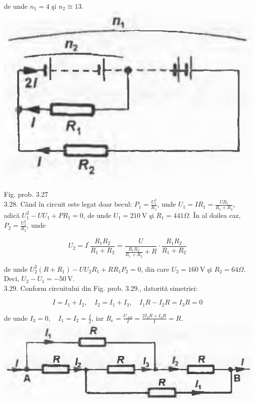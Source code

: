 \documentclass[10pt]{article}
\begin{document}
de unde $n_{1}=4$ şi $n_{2} \cong 13$.\\
\includegraphics[max width=\textwidth, center]{2025_07_01_5b3ff9fa0d508c8e9f17g-346}

Fig. prob. 3.27\\
3.28. Când în circuit este legat doar becul: $P_{1}=\frac{U_{1}^{2}}{R_{1}}$, unde $U_{1}=I R_{1}=\frac{U R_{1}}{R_{1}+R_{2}}$, adică $U_{1}^{2}-U U_{1}+P R_{1}=0$, de unde $U_{1}=210 \mathrm{~V}$ şi $R_{1}=441 \Omega$. În al doilea caz, $P_{2}=\frac{U_{2}^{2}}{R_{2}}$, unde

$$
U_{2}=I^{\prime} \frac{R_{1} R_{2}}{R_{1}+R_{2}}=\frac{U}{\frac{R_{1} R_{2}}{R_{1}+R_{2}}+R} \cdot \frac{R_{1} R_{2}}{R_{1}+R_{2}}
$$

de unde $U_{2}^{2}\left(R+R_{1}\right)-U U_{2} R_{1}+R R_{1} P_{2}=0$, din care $U_{2}=160 \mathrm{~V}$ şi $R_{2}=64 \Omega$. Deci, $U_{2}-U_{1}=-50 \mathrm{~V}$.\\
3.29. Conform circuitului din Fig. prob. 3.29., datorită simetriei:

$$
I=I_{1}+I_{2}, \quad I_{2}=I_{1}+I_{3}, \quad I_{1} R-I_{2} R=I_{3} R=0
$$

de unde $I_{3}=0, \quad I_{1}=I_{2}=\frac{I}{2}$, iar $R_{e}=\frac{U_{A B}}{I}=\frac{2 I_{2} R+I_{3} R}{I}=R$.\\
\includegraphics[max width=\textwidth, center]{2025_07_01_5b3ff9fa0d508c8e9f17g-347(1)}
\end{document}
